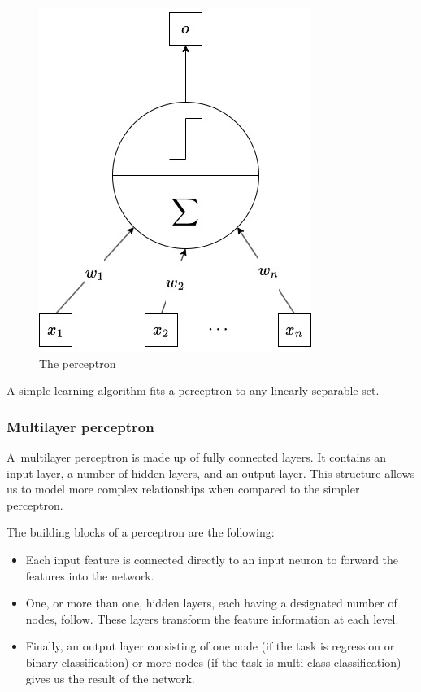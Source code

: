 		\begin{figure}[H]
			\centering
			\includegraphics[width=0.5\linewidth]{img/img-perceptron}
			\caption{The perceptron}
			\label{fig:img-perceptron}
		\end{figure}
		
		
		A simple learning algorithm fits a perceptron to any linearly separable set.


		\bigskip
		\subsubsection{Multilayer perceptron}
		
		A multilayer perceptron is made up of fully connected layers. It contains an input layer, a number of hidden layers, and an output layer. This structure allows us to model more complex relationships when compared to the simpler perceptron. 
		
		The building blocks of a perceptron are the following:
		
		\begin{itemize}
			\item Each input feature is connected directly to an input neuron to forward the features into the network.
			\item One, or more than one, hidden layers, each having a designated number of nodes, follow. These layers transform the feature information at each level.
			\item Finally, an output layer consisting of one node (if the task is regression or binary classification) or more nodes (if the task is multi-class classification) gives us the result of the network.
		\end{itemize}
		\bigskip
		
